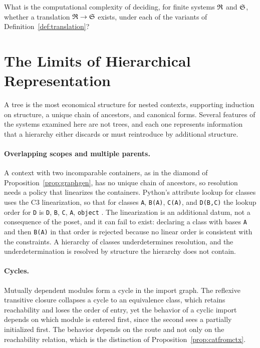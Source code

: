 \begin{question}\label{q:complexity}
What is the computational complexity of deciding, for finite systems $\mathfrak R$ and $\mathfrak S$, whether a translation $\mathfrak R\to\mathfrak S$ exists, under each of the variants of Definition~\ref{def:translation}?
\end{question}

\section{The Limits of Hierarchical Representation}

A tree is the most economical structure for nested contexts, supporting induction on structure, a unique chain of ancestors, and canonical forms. Several features of the systems examined here are not trees, and each one represents information that a hierarchy either discards or must reintroduce by additional structure.

\paragraph{Overlapping scopes and multiple parents.} A context with two incomparable containers, as in the diamond of Proposition~\ref{prop:graphgen}, has no unique chain of ancestors, so resolution needs a policy that linearizes the containers. Python's attribute lookup for classes uses the C3 linearization, so that for classes \texttt{A}, \texttt{B(A)}, \texttt{C(A)}, and \texttt{D(B,C)} the lookup order for \texttt{D} is \texttt{D}, \texttt{B}, \texttt{C}, \texttt{A}, \texttt{object} \cite{mro}. The linearization is an additional datum, not a consequence of the poset, and it can fail to exist: declaring a class with bases \texttt{A} and then \texttt{B(A)} in that order is rejected because no linear order is consistent with the constraints. A hierarchy of classes underdetermines resolution, and the underdetermination is resolved by structure the hierarchy does not contain.

\paragraph{Cycles.} Mutually dependent modules form a cycle in the import graph. The reflexive transitive closure collapses a cycle to an equivalence class, which retains reachability and loses the order of entry, yet the behavior of a cyclic import depends on which module is entered first, since the second sees a partially initialized first. The behavior depends on the route and not only on the reachability relation, which is the distinction of Proposition~\ref{prop:catfromctx}.

